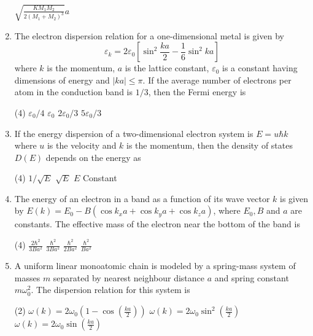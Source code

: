 \begin{enumerate}
\begin{tasks}
\task[\textbf{D.}] $\sqrt{\frac{K M_{1} M_{2}}{2\left(M_{1}+M_{2}\right)^{3}}} a$
\end{tasks}
	\item The electron dispersion relation for a one-dimensional metal is given by
	$$
	\varepsilon_{k}=2 \varepsilon_{0}\left[\sin ^{2} \frac{k a}{2}-\frac{1}{6} \sin ^{2} k a\right]
	$$
	where $k$ is the momentum, $a$ is the lattice constant, $\varepsilon_{0}$ is a constant having dimensions of energy and $|k a| \leq \pi .$ If the average number of electrons per atom in the conduction band is $1 / 3$, then the Fermi energy is
	{}
\begin{tasks}(4)
\task[\textbf{A.}] $\varepsilon_{0} / 4$
\task[\textbf{B.}]  $\varepsilon_{0}$
\task[\textbf{C.}] $2 \varepsilon_{0} / 3$
\task[\textbf{D.}] $5 \varepsilon_{0} / 3$
\end{tasks}
	\item If the energy dispersion of a two-dimensional electron system is $E=u \hbar k$ where $u$ is the velocity and $k$ is the momentum, then the density of states $D(E)$ depends on the energy as
	{}
\begin{tasks}(4)
\task[\textbf{A.}] $1 / \sqrt{E}$
\task[\textbf{B.}] $\sqrt{E}$
\task[\textbf{C.}] $E$
\task[\textbf{D.}] Constant
\end{tasks}
	\item The energy of an electron in a band as a function of its wave vector $k$ is given by $E(k)=E_{0}-B\left(\cos k_{x} a+\cos k_{y} a+\cos k_{z} a\right)$, where $E_{0}, B$ and $a$ are constants. The effective mass of the electron near the bottom of the band is
	{}
\begin{tasks}(4)
\task[\textbf{A.}] $\frac{2 \hbar^{2}}{3 B a^{2}}$
\task[\textbf{B.}] $\frac{\hbar^{2}}{3 B a^{2}}$
\task[\textbf{C.}] $\frac{\hbar^{2}}{2 B a^{2}}$
\task[\textbf{D.}] $\frac{\hbar^{2}}{B a^{2}}$
\end{tasks}
	\item A uniform linear monoatomic chain is modeled by a spring-mass system of masses $m$ separated by nearest neighbour distance $a$ and spring constant $m \omega_{0}^{2} .$ The dispersion relation for this system is
	{}
\begin{tasks}(2)
\task[\textbf{A.}] $\omega(k)=2 \omega_{0}\left(1-\cos \left(\frac{k a}{2}\right)\right)$
\task[\textbf{B.}] $\omega(k)=2 \omega_{0} \sin ^{2}\left(\frac{k a}{2}\right)$
\task[\textbf{C.}] $\omega(k)=2 \omega_{0} \sin \left(\frac{k a}{2}\right)$

\end{tasks}
\end{enumerate}
